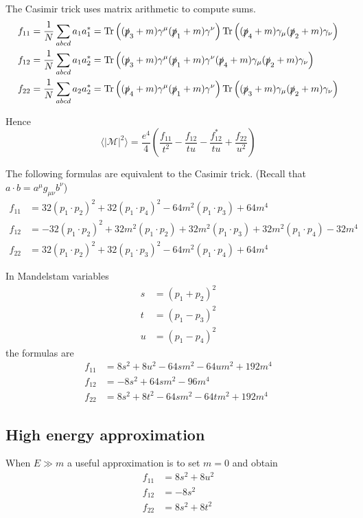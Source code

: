 \documentclass[12pt]{article}
\begin{document}
The Casimir trick uses matrix arithmetic to compute sums.
\begin{align*}
f_{11}&=\frac{1}{N}\sum_{abcd}a_1a_1^*=
\mathop{\rm Tr}\left(
(\slashed{p}_3+m)\gamma^\mu(\slashed{p}_1+m)\gamma^\nu
\right)
\mathop{\rm Tr}\left(
(\slashed{p}_4+m)\gamma_\mu(\slashed{p}_2+m)\gamma_\nu
\right)
\\
f_{12}&=\frac{1}{N}\sum_{abcd}a_1a_2^*=
\mathop{\rm Tr}\left(
(\slashed{p}_3+m)\gamma^\mu(\slashed{p}_1+m)\gamma^\nu
(\slashed{p}_4+m)\gamma_\mu(\slashed{p}_2+m)\gamma_\nu
\right)
\\
f_{22}&=\frac{1}{N}\sum_{abcd}a_2a_2^*=
\mathop{\rm Tr}\left(
(\slashed{p}_4+m)\gamma^\mu(\slashed{p}_1+m)\gamma^\nu
\right)
\mathop{\rm Tr}\left(
(\slashed{p}_3+m)\gamma_\mu(\slashed{p}_2+m)\gamma_\nu
\right)
\end{align*}

Hence
\begin{equation*}
\langle|\mathcal{M}|^2\rangle
=\frac{e^4}{4}
\left(
\frac{f_{11}}{t^2}-\frac{f_{12}}{tu}-\frac{f_{12}^*}{tu}+\frac{f_{22}}{u^2}
\right)
\end{equation*}

The following formulas are equivalent to the Casimir trick.
(Recall that $a\cdot b=a^\mu g_{\mu\nu}b^\nu$)
\begin{align*}
f_{11}&=
32 (p_1\cdot p_2)^2 +
32 (p_1\cdot p_4)^2 -
64 m^2 (p_1\cdot p_3) + 64 m^4
\\
f_{12}&=
-32 (p_1\cdot p_2)^2 +
32 m^2 (p_1\cdot p_2) +
32 m^2 (p_1\cdot p_3) +
32 m^2 (p_1\cdot p_4) - 32m^4
\\
f_{22}&=
32 (p_1\cdot p_2)^2 +
32 (p_1\cdot p_3)^2 -
64 m^2 (p_1\cdot p_4) + 64 m^4
\end{align*}

In Mandelstam variables
\begin{align*}
s&=(p_1+p_2)^2
\\
t&=(p_1-p_3)^2
\\
u&=(p_1-p_4)^2
\end{align*}
the formulas are
\begin{align*}
f_{11} &= 8 s^2 + 8 u^2 - 64 s m^2 - 64 u m^2 + 192 m^4
\\
f_{12} &= -8 s^2 + 64 s m^2 - 96 m^4
\\
f_{22} &= 8 s^2 + 8 t^2 - 64 s m^2 - 64 t m^2 + 192 m^4
\end{align*}

\subsection*{High energy approximation}
When $E\gg m$ a useful approximation is to set $m=0$ and obtain
\begin{align*}
f_{11}&=8s^2+8u^2\\
f_{12}&=-8s^2\\
f_{22}&=8s^2+8t^2
\end{align*}
\end{document}
